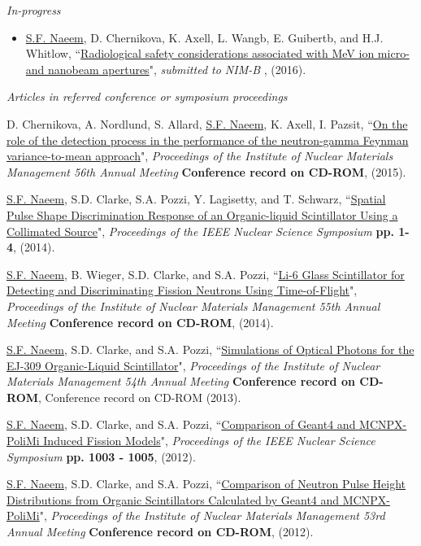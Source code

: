 \documentclass[paper=letter,fontsize=11pt]{scrartcl} %
\newcommand{\PaperEntry}[7]{
		\noindent #1, ``\href{#7}{#2}", \textit{#3} \textbf{#4}, #5 (#6).}
\begin{document}
\textit{In-progress}
\begin{itemize}
\item \PaperEntry{\underline{S.F. Naeem}, D. Chernikova, K. Axell, L. Wangb, E. Guibertb, and H.J. Whitlow}{Radiological safety considerations associated with MeV ion micro- and nanobeam apertures}{submitted to NIM-B}{}{}{2016}{}
\end{itemize}

\textit{{Articles in referred conference or symposium proceedings}}
\begin{etaremune}
\item \PaperEntry{D. Chernikova, A. Nordlund, S. Allard, \underline{S.F. Naeem}, K. Axell, I. Pazsit}{On the role of the detection process in the performance of the neutron-gamma Feynman variance-to-mean approach}{Proceedings of the Institute of Nuclear Materials Management 56th Annual Meeting} {Conference record on CD-ROM}{}{2015}
{}

\item \PaperEntry{\underline{S.F. Naeem}, S.D. Clarke, S.A. Pozzi, Y. Lagisetty, and T. Schwarz}{Spatial Pulse Shape Discrimination Response of an Organic-liquid Scintillator Using a Collimated Source}{Proceedings of the IEEE Nuclear Science Symposium} {pp. 1-4}{}{2014}
{http://dx.doi.org/10.1109/NSSMIC.2014.7431168}

\item \PaperEntry{\underline{S.F. Naeem}, B. Wieger, S.D. Clarke, and S.A. Pozzi}{Li-6 Glass Scintillator for Detecting and Discriminating Fission Neutrons Using Time-of-Flight}{Proceedings of the Institute of Nuclear Materials Management 55th Annual Meeting} {Conference record on CD-ROM}{}{2014}
{}

\item \PaperEntry{\underline{S.F. Naeem}, S.D. Clarke, and S.A. Pozzi}{Simulations of Optical Photons for the EJ-309 Organic-Liquid Scintillator}{Proceedings of the Institute of Nuclear Materials Management 54th Annual Meeting} {Conference record on CD-ROM}{Conference record on CD-ROM}{2013}
{}

\item \PaperEntry{\underline{S.F. Naeem}, S.D. Clarke, and S.A. Pozzi}{Comparison of Geant4 and MCNPX-PoliMi Induced Fission Models}{Proceedings of the IEEE Nuclear Science Symposium} {pp. 1003 - 1005}{}{2012}
{http://dx.doi.org/10.1109/NSSMIC.2012.6551258}

\item \PaperEntry{\underline{S.F. Naeem}, S.D. Clarke, and S.A. Pozzi}{Comparison of Neutron Pulse Height Distributions from Organic Scintillators Calculated by Geant4 and MCNPX-PoliMi}{Proceedings of the Institute of Nuclear Materials Management 53rd Annual Meeting} {Conference record on CD-ROM}{}{2012}
{}


\end{etaremune}
\end{document}
